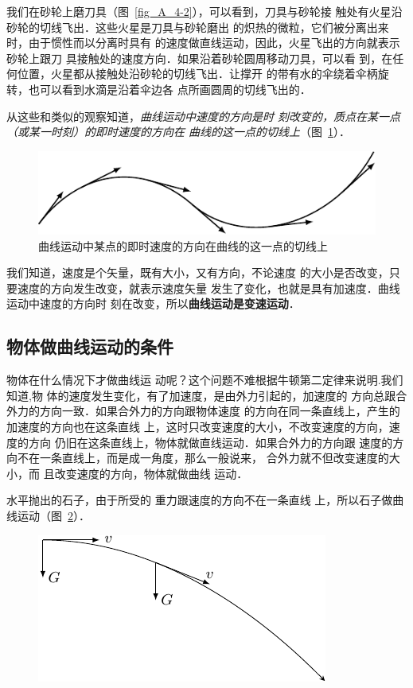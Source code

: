     我们在砂轮上磨刀具（图~\ref{fig_A_4-2}），可以看到，刀具与砂轮接
触处有火星沿砂轮的切线飞出．这些火星是刀具与砂轮磨出
的炽热的微粒，它们被分离出来时，由于惯性而以分离时具有
的速度做直线运动，因此，火星飞出的方向就表示砂轮上跟刀
具接触处的速度方向．如果沿着砂轮圆周移动刀具，可以看
到，在任何位置，火星都从接触处沿砂轮的切线飞出．让撑开
的带有水的伞绕着伞柄旋转，也可以看到水滴是沿着伞边各
点所画圆周的切线飞出的．

从这些和类似的观察知道，\textit{曲线运动中速度的方向是时
刻改变的，质点在某一点（或某一时刻）的即时速度的方向在
曲线的这一点的切线上}（图~\ref{fig_A_4-3}）．

\begin{figure}[htbp]
    \centering
    \includegraphics{fig/A/4-3.pdf}
    \caption{曲线运动中某点的即时速度的方向在曲线的这一点的切线上}\label{fig_A_4-3}
\end{figure}

我们知道，速度是个矢量，既有大小，又有方向，不论速度
的大小是否改变，只要速度的方向发生改变，就表示速度矢量
发生了变化，也就是具有加速度．曲线运动中速度的方向时
刻在改变，所以\textbf{曲线运动是变速运动}．

\subsection{物体做曲线运动的条件}

物体在什么情况下才做曲线运
动呢？这个问题不难根据牛顿第二定律来说明.我们知道,物
体的速度发生变化，有了加速度，是由外力引起的，加速度的
方向总跟合外力的方向一致．如果合外力的方向跟物体速度
的方向在同一条直线上，产生的加速度的方向也在这条直线
上，这时只改变速度的大小，不改变速度的方向，速度的方向
仍旧在这条直线上，物体就做直线运动．如果合外力的方向跟
速度的方向不在一条直线上，而是成一角度，那么一般说来，
合外力就不但改变速度的大小，而
且改变速度的方向，物体就做曲线
运动．

    水平抛出的石子，由于所受的
重力跟速度的方向不在一条直线
上，所以石子做曲线运动（图~\ref{fig_A_4-4}）．

\begin{figure}[htbp]
    \centering
    \includegraphics{fig/A/4-4.pdf}
    \caption{}\label{fig_A_4-4}
\end{figure}
 

